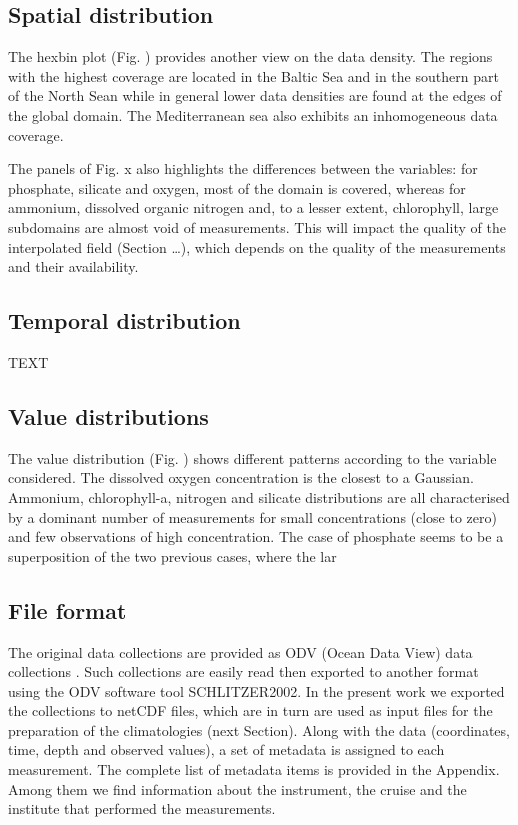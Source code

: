 \documentclass[essd, manuscript]{copernicus}
\begin{document}
\subsection{Spatial distribution}

The hexbin plot (Fig. ) provides another view on the data density. The regions with the highest coverage are located in the Baltic Sea and in the southern part of the North Sean while in general lower data densities are found at the edges of the global domain. The Mediterranean sea also exhibits an inhomogeneous data coverage. 

The panels of Fig. x also highlights the differences between the variables: for phosphate, silicate and oxygen, most of the domain is covered, whereas for ammonium, dissolved organic nitrogen and, to a lesser extent, chlorophyll, large subdomains are almost void of measurements. This will impact the quality of the interpolated field (Section …), which depends on the quality of the measurements and their availability.




\subsection{Temporal distribution}
TEXT

\subsection{Value distributions}

The value distribution (Fig. ) shows different patterns according to the variable considered. The dissolved oxygen concentration is the closest to a Gaussian. Ammonium, chlorophyll-a, nitrogen and silicate distributions are all characterised by a dominant number of measurements for small concentrations (close to zero) and few observations of high concentration. The case of phosphate seems to be a superposition of the two previous cases, where the lar







\subsection{File format}
The original data collections are provided as ODV (Ocean Data View) data collections \citep{Lowry2023}. Such collections are easily read then exported to another format using the ODV software tool {SCHLITZER2002}. In the present work we exported the collections to netCDF files, which are in turn are used as input files for the preparation of the climatologies (next Section). 
Along with the data (coordinates, time, depth and observed values), a set of metadata is assigned to each measurement. The complete list of metadata items is provided in the Appendix. Among them we find information about the instrument, the cruise and the institute that performed the measurements. 
\end{document}
